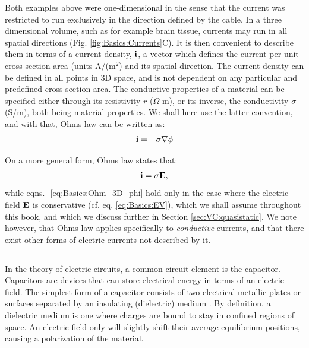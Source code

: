 Both examples above were one-dimensional in the sense that the current was restricted to run exclusively in the direction defined by the cable. In a three dimensional volume, such as for example brain tissue, currents may run in all spatial directions (Fig. \ref{fig:Basics:Currents}C). It is then convenient to describe them in terms of a current density, ${\bf i}$,  a vector which defines the current per unit cross section area (units A/(m$^2$) and its spatial direction. The current density can be defined in all points in 3D space, and is not dependent on any particular and predefined cross-section area. The conductive properties of a material can be specified either through its resistivity $r$ ($\Omega$ m), or its inverse, the conductivity $\sigma$ (S/m), both being material properties. We shall here use the latter convention, and with that, Ohms law can be written as:
\begin{equation}
{\bf i} = - \sigma \nabla \phi
\label{eq:Basics:Ohm_3D_phi}
\end{equation}

On a more general form, Ohms law states that:
\begin{equation}
{\bf i} = \sigma {\bf E}, 
\label{eq:Basics:Ohm_general}
\end{equation}
while eqns. \label{eq:Basics:Ohm_R}-\ref{eq:Basics:Ohm_3D_phi} hold only in the case where the electric field ${\bf E}$ is conservative (cf. eq. \ref{eq:Basics:EV}), which we shall assume throughout this book, and which we discuss further in Section \ref{sec:VC:quasistatic}. We note however, that Ohms law applies specifically to \textit{conductive} currents, and that there exist other forms of electric currents not described by it.


\subsection{}
\label{sec:Basics:CapacitiveCurrent} 
In the theory of electric circuits, a common circuit element is the capacitor. Capacitors are devices that can store electrical energy in terms of an electric field. The simplest form of a capacitor consists of two electrical metallic plates or surfaces separated by an insulating (dielectric) medium .  By definition, a dielectric medium is one where charges are bound to stay in confined regions of space. An electric field only will slightly shift their average equilibrium positions, causing a polarization of the material.

